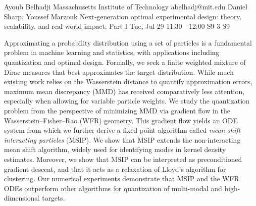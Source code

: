 \begin{talk}
  {Ayoub Belhadji}%
  {Massachusetts Institute of Technology}%
  {abelhadj@mit.edu}%
  {Daniel Sharp, Youssef Marzouk}%
  {Next-generation optimal experimental design: theory, scalability, and real world impact: Part I}%
  {}%
  {Tue, Jul 29 11:30---12:00}%
  {S9-3}%
  {S9}%
    
   
Approximating a probability distribution using a set of particles is a fundamental problem in machine learning and statistics, with applications including  quantization and optimal design. Formally, we seek a finite weighted mixture of Dirac measures that best approximates the target distribution. While much existing work relies on the Wasserstein distance to quantify approximation errors, maximum mean discrepancy (MMD) has received comparatively less attention, especially when allowing for variable particle weights. We study the quantization problem from the perspective of minimizing MMD via gradient flow in the Wasserstein--Fisher--Rao (WFR) geometry. This gradient flow yields an ODE system from which we further derive a fixed-point algorithm called \emph{mean shift interacting particles} (MSIP). We show that MSIP extends the non-interacting mean shift algorithm, widely used for identifying modes in kernel density estimates. Moreover, we show that MSIP can be interpreted as preconditioned gradient descent, and that it acts as a relaxation of Lloyd's algorithm for clustering. 
Our numerical experiments demonstrate that MSIP and the WFR ODEs outperform other algorithms for quantization of multi-modal and high-dimensional targets.
\medskip


\end{talk}

